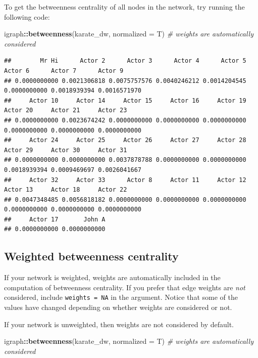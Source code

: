 \documentclass[
]{book}
\newenvironment{Shaded}{\begin{snugshade}}{\end{snugshade}}
\newcommand{\AttributeTok}[1]{\textcolor[rgb]{0.13,0.29,0.53}{#1}}
\newcommand{\CommentTok}[1]{\textcolor[rgb]{0.56,0.35,0.01}{\textit{#1}}}
\newcommand{\FunctionTok}[1]{\textcolor[rgb]{0.13,0.29,0.53}{\textbf{#1}}}
\newcommand{\NormalTok}[1]{#1}
\newcommand{\SpecialCharTok}[1]{\textcolor[rgb]{0.81,0.36,0.00}{\textbf{#1}}}
\begin{document}
To get the betweenness centrality of all nodes in the network, try running the following code:

\begin{Shaded}
\begin{Highlighting}[]
\NormalTok{igraph}\SpecialCharTok{::}\FunctionTok{betweenness}\NormalTok{(karate\_dw, }\AttributeTok{normalized =}\NormalTok{ T) }\CommentTok{\# weights are automatically considered}
\end{Highlighting}
\end{Shaded}

\begin{verbatim}
##        Mr Hi      Actor 2      Actor 3      Actor 4      Actor 5      Actor 6      Actor 7      Actor 9 
## 0.0000000000 0.0021306818 0.0075757576 0.0040246212 0.0014204545 0.0000000000 0.0018939394 0.0016571970 
##     Actor 10     Actor 14     Actor 15     Actor 16     Actor 19     Actor 20     Actor 21     Actor 23 
## 0.0000000000 0.0023674242 0.0000000000 0.0000000000 0.0000000000 0.0000000000 0.0000000000 0.0000000000 
##     Actor 24     Actor 25     Actor 26     Actor 27     Actor 28     Actor 29     Actor 30     Actor 31 
## 0.0000000000 0.0000000000 0.0037878788 0.0000000000 0.0000000000 0.0018939394 0.0009469697 0.0026041667 
##     Actor 32     Actor 33      Actor 8     Actor 11     Actor 12     Actor 13     Actor 18     Actor 22 
## 0.0047348485 0.0056818182 0.0000000000 0.0000000000 0.0000000000 0.0000000000 0.0000000000 0.0000000000 
##     Actor 17       John A 
## 0.0000000000 0.0000000000
\end{verbatim}

\subsection{Weighted betweenness centrality}\label{weighted-betweenness-centrality}

If your network is weighted, weights are automatically included in the computation of betweenness centrality. If you prefer that edge weights are \emph{not} considered, include \texttt{weights\ =\ NA} in the argument. Notice that some of the values have changed depending on whether weights are considered or not.

If your network is unweighted, then weights are not considered by default.

\begin{Shaded}
\begin{Highlighting}[]
\NormalTok{igraph}\SpecialCharTok{::}\FunctionTok{betweenness}\NormalTok{(karate\_dw, }\AttributeTok{normalized =}\NormalTok{ T) }\CommentTok{\# weights are automatically considered}
\end{Highlighting}
\end{Shaded}
\end{document}
